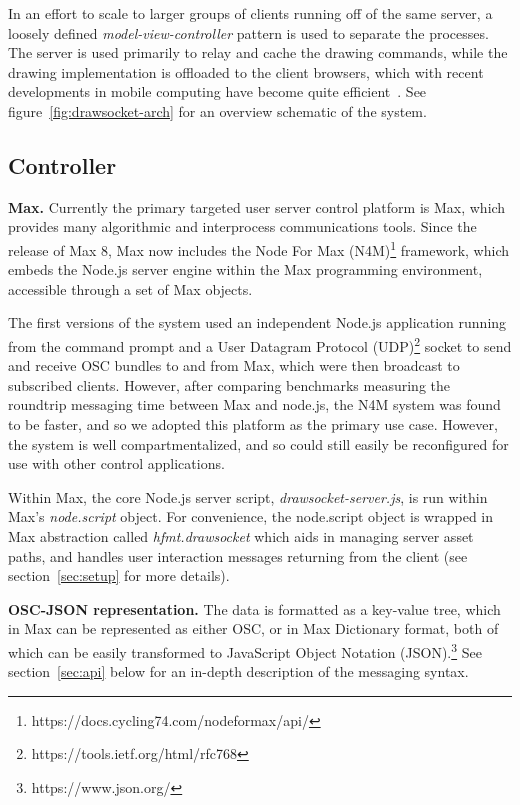 In an effort to scale to larger groups of clients running off of the same server, a loosely defined \textit{model-view-controller} \cite{krasner1988description} pattern is used to separate the processes. 
The server is used primarily to relay and cache the drawing commands, while the drawing implementation is offloaded to the client browsers, which with recent developments in mobile computing have become quite efficient~\cite{halpern2016mobile}.
See figure~\ref{fig:drawsocket-arch} for an overview schematic of the system. 

\subsection{Controller}
\noindent
\textbf{Max.}
Currently the primary targeted user server control platform is Max, which provides many algorithmic and interprocess communications tools. 
Since the release of Max 8, Max now includes the Node For Max (N4M)\footnote{https://docs.cycling74.com/nodeformax/api/} framework, which embeds the Node.js server engine within the Max programming environment, accessible through a set of Max objects.

The first versions of the \drawsocket system used an independent Node.js application running from the command prompt and a User Datagram Protocol (UDP)\footnote{https://tools.ietf.org/html/rfc768} socket to send and receive OSC bundles to and from Max, which were then broadcast to subscribed clients.
However, after comparing benchmarks measuring the roundtrip messaging time between Max and node.js, the N4M system was found to be faster, and so we adopted this platform as the primary use case.
However, the \drawsocket system is well compartmentalized, and so could still easily be reconfigured for use with other control applications.

Within Max, the core Node.js server script, \textit{drawsocket-server.js}, is run within Max's \textit{node.script} object. 
For convenience, the node.script object is wrapped in Max abstraction called \textit{hfmt.drawsocket} which aids in managing server asset paths, and handles user interaction messages returning from the client (see section~\ref{sec:setup} for more details).

\medskip
\noindent
\textbf{OSC-JSON representation.}
The \drawsocket data is formatted as a key-value tree, which in Max can be represented as either OSC, or in Max Dictionary format,
both of which can be easily transformed to JavaScript Object Notation (JSON).\footnote{https://www.json.org/} See section~\ref{sec:api} below for an in-depth description of the \drawsocket messaging syntax.

